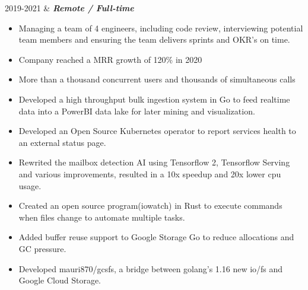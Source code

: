 \documentclass[]{cv-mauri}
\begin{document}
\begin{tabularcv}
    2019-2021   &   
                    \textbf{\textit{Remote / Full-time}}
            \begin{itemize}
            	\item Managing a team of 4 engineers, including code review, interviewing potential team members and ensuring the team delivers sprints and OKR's on time.
            	\item Company reached a MRR growth of 120\% in 2020
            	\item More than a thousand concurrent users and thousands of simultaneous calls
            	\item Developed a high throughput bulk ingestion system in Go to feed realtime data into a PowerBI data lake for later mining and visualization.
            	\item Developed an Open Source Kubernetes operator to report services health to an external status page.
            	\item Rewrited the mailbox detection AI using Tensorflow 2, Tensorflow Serving and various improvements, resulted in a 10x speedup and 20x lower cpu usage.
            	\item Created an open source program(iowatch) in Rust to execute commands when files change to automate multiple tasks.
            	\item Added buffer reuse support to Google Storage Go to reduce allocations and GC pressure.
            	\item Developed mauri870/gcsfs, a bridge between golang's 1.16 new io/fs and Google Cloud Storage.
            \end{itemize}
                    \\[\vspacepar]


\end{tabularcv}
\end{document}
